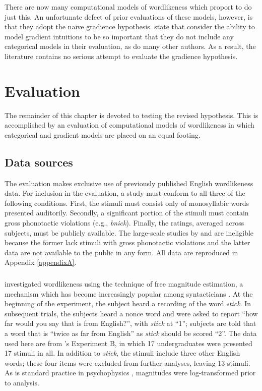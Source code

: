 \noindent There are now many computational models of wordlikeness which proport to do just this. An unfortunate defect of prior evaluations of these models, however, is that they adopt the naïve gradience hypothesis. \citet[382]{Hayes2008a} state that consider the ability to model gradient intuitions to be so important that they do not include any categorical models in their evaluation, as do many other authors. As a result, the literature contains no serious attempt to evaluate the gradience hypothesis.

\section{Evaluation} \label{2evaluation}

The remainder of this chapter is devoted to testing the revised hypothesis. This is accomplished by an evaluation of computational models of wordlikeness in which categorical and gradient models are placed on an equal footing.

\subsection{Data sources}

The evaluation makes exclusive use of previously published English wordlikeness data. For inclusion in the evaluation, a study must conform to all three of the following conditions. First, the stimuli must consist only of monosyllabic words presented auditorily. Secondly, a significant portion of the stimuli must contain gross phonotactic violations (e.g., \emph{bnick}). Finally, the ratings, averaged across subjects, must be publicly available. The large-scale studies by \citet{Bailey2001} and \citet{Shademan2006,Shademan2007} are ineligible because the former lack stimuli with gross phonotactic violations and the latter data are not available to the public in any form. All data are reproduced in Appendix \ref{appendixA}.

\subsubsection{\citealt{Greenberg1964}}

\citet{Greenberg1964} investigated wordlikeness using the technique of free magnitude estimation, a mechanism which has become increasingly popular among syntacticians \citep[e.g.,][]{Bard1996}. At the beginning of the experiment, the subject heard a recording of the word \emph{stick}. In subsequent trials, the subjects heard a nonce word and were asked to report ``how far would you say that is from English?'', with \emph{stick} at ``1''; subjects are told that a word that is ``twice as far from English'' as \emph{stick} should be scored ``2''. The data used here are from \citeauthor{Greenberg1964}'s Experiment B, in which 17 undergraduates were presented 17 stimuli in all. In addition to \emph{stick}, the stimuli include three other English words; these four items were excluded from further analyses, leaving 13 stimuli. As is standard practice in psychophysics \citep[e.g.,][]{Butler1987}, magnitudes were log-transformed prior to analysis.

